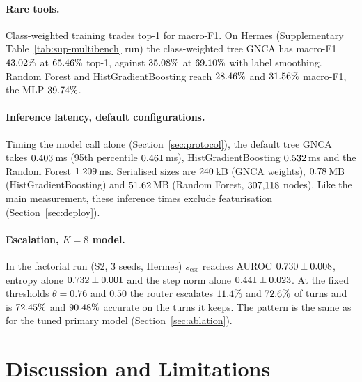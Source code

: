 \documentclass[10pt]{article}
\begin{document}
\paragraph{Rare tools.} Class-weighted training trades top-1 for macro-F1. On Hermes (Supplementary Table~\ref{tab:sup-multibench} run) the class-weighted tree GNCA has macro-F1 $43.02\%$ at $65.46\%$ top-1, against $35.08\%$ at $69.10\%$ with label smoothing. Random Forest and HistGradientBoosting reach $28.46\%$ and $31.56\%$ macro-F1, the MLP $39.74\%$.
\paragraph{Inference latency, default configurations.} Timing the model call alone (Section~\ref{sec:protocol}), the default tree GNCA takes $0.403$\,ms (95th percentile $0.461$\,ms), HistGradientBoosting $0.532$\,ms and the Random Forest $1.209$\,ms. Serialised sizes are $240$\,kB (GNCA weights), $0.78$\,MB (HistGradientBoosting) and $51.62$\,MB (Random Forest, $307{,}118$ nodes). Like the main measurement, these inference times exclude featurisation (Section~\ref{sec:deploy}).
\paragraph{Escalation, $K{=}8$ model.} In the factorial run (S2, 3 seeds, Hermes) $s_{\text{esc}}$ reaches AUROC $0.730 \pm 0.008$, entropy alone $0.732 \pm 0.001$ and the step norm alone $0.441 \pm 0.023$. At the fixed thresholds $\theta{=}0.76$ and $0.50$ the router escalates $11.4\%$ and $72.6\%$ of turns and is $72.45\%$ and $90.48\%$ accurate on the turns it keeps. The pattern is the same as for the tuned primary model (Section~\ref{sec:ablation}).

\section{Discussion and Limitations}\label{sec:discussion}
\end{document}
